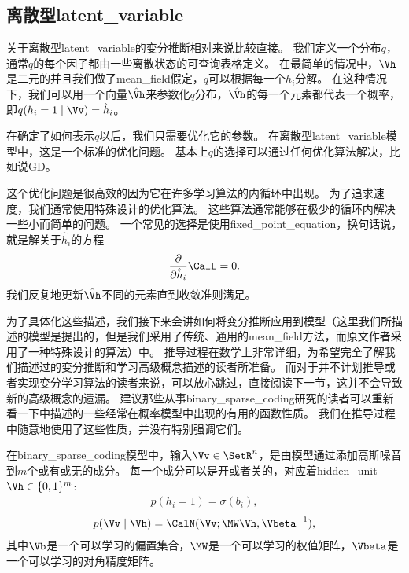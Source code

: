 \subsection{离散型\gls{latent_variable}}
\label{sec:discrete_latent_variables}

关于离散型\gls{latent_variable}的变分推断相对来说比较直接。
我们定义一个分布$q$，通常$q$的每个因子都由一些离散状态的可查询表格定义。
在最简单的情况中，$\Vh$是二元的并且我们做了\gls{mean_field}假定，$q$可以根据每一个$h_i$分解。
在这种情况下，我们可以用一个向量$\hat{\Vh}$来参数化$q$分布，$\hat{\Vh}$的每一个元素都代表一个概率，即$q(h_i = 1\mid \Vv) = \hat{h}_i$。


在确定了如何表示$q$以后，我们只需要优化它的参数。
在离散型\gls{latent_variable}模型中，这是一个标准的优化问题。
基本上$q$的选择可以通过任何优化算法解决，比如说\gls{GD}。


这个优化问题是很高效的因为它在许多学习算法的内循环中出现。
为了追求速度，我们通常使用特殊设计的优化算法。
这些算法通常能够在极少的循环内解决一些小而简单的问题。
一个常见的选择是使用\gls{fixed_point_equation}，换句话说，就是解关于$\hat{h}_i$的方程
\begin{align}
	\frac{\partial}{\partial \hat{h}_i}\CalL = 0.
\end{align}
我们反复地更新$\hat{\Vh}$不同的元素直到收敛准则满足。


为了具体化这些描述，我们接下来会讲如何将变分推断应用到模型（这里我们所描述的模型是\citet{henniges2010binary}提出的，但是我们采用了传统、通用的\gls{mean_field}方法，而原文作者采用了一种特殊设计的算法）中。
推导过程在数学上非常详细，为希望完全了解我们描述过的变分推断和学习高级概念描述的读者所准备。
而对于并不计划推导或者实现变分学习算法的读者来说，可以放心跳过，直接阅读下一节，这并不会导致新的高级概念的遗漏。
建议那些从事\gls{binary_sparse_coding}研究的读者可以重新看一下中描述的一些经常在概率模型中出现的有用的函数性质。
我们在推导过程中随意地使用了这些性质，并没有特别强调它们。


在\gls{binary_sparse_coding}模型中，输入$\Vv\in\SetR^n$，是由模型通过添加高斯噪音到$m$个或有或无的成分。
每一个成分可以是开或者关的，对应着\gls{hidden_unit} $\Vh \in\{0,1\}^m$:
\begin{align}
	p(h_i = 1) = \sigma(b_i),
\end{align}
\begin{align}
	p(\Vv\mid\Vh) = \CalN(\Vv;\MW \Vh,{\Vbeta}^{-1}),
\end{align}
其中$\Vb$是一个可以学习的偏置集合，$\MW$是一个可以学习的权值矩阵，${\Vbeta}$是一个可以学习的对角精度矩阵。


